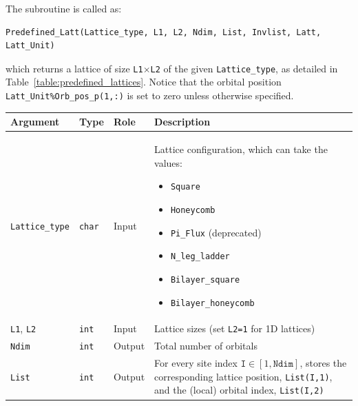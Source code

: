 The subroutine is called as:
\begin{lstlisting}[style=fortran]
Predefined_Latt(Lattice_type, L1, L2, Ndim, List, Invlist, Latt, Latt_Unit)
\end{lstlisting}
which returns a lattice of size \texttt{L1$\times$L2} of the given \texttt{Lattice\_type}, as detailed in Table~\ref{table:predefined_lattices}. Notice that the orbital position \texttt{Latt\_Unit\%Orb\_pos\_p(1,:)} is set to zero unless otherwise specified.
%
\begin{table}[h!]
	\begin{center}
	\begin{tabular}{@{} p{}  p{} p{} p{}  @{}}
		\toprule
		Argument                 & Type                & Role   & Description \\
		\midrule
		\texttt{Lattice\_type}   & \texttt{char}       & Input  & Lattice configuration, which can take the values:
		\begin{itemize}
			\setlength{\itemsep}{0pt} \setlength{\parskip}{0pt} \setlength{\parsep}{0pt}
			\vspace{-1\topsep} 
			\item[-] \texttt{Square}
			\item[-] \texttt{Honeycomb}
			\item[-] \texttt{Pi\_Flux}  (deprecated)
			\item[-] \texttt{N\_leg\_ladder}
			\item[-] \texttt{Bilayer\_square}
			\item[-] \texttt{Bilayer\_honeycomb}
			\vspace{-1.2\topsep} 
		\end{itemize} \\
		\texttt{L1}, \texttt{L2} & \texttt{int}        & Input  & Lattice sizes (set \texttt{L2=1} for 1D lattices)\\
		\texttt{Ndim}            & \texttt{int}        & Output & Total number of orbitals\\
		\texttt{List}            & \texttt{int}        & Output & For every site index $\texttt{I} \in [1,\texttt{Ndim}]$, stores the corresponding lattice position, \texttt{List(I,1)}, and the (local) orbital index, \texttt{List(I,2)}\\

\end{tabular}
\end{center}
\end{table}
